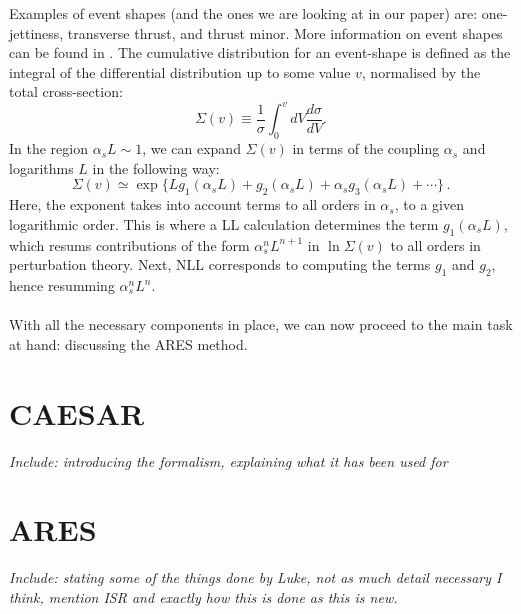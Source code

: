 Examples of event shapes (and the ones we are looking at in our paper) are: one-jettiness, transverse thrust, and thrust minor. More information on event shapes can be found in \cite{Banfi:2016yyq}. 
The cumulative distribution for an event-shape is defined as the integral of the differential distribution up to some value $v$, normalised by the total cross-section:
\begin{equation}
	\Sigma(v)\equiv\frac{1}{\sigma}\int_0^vdV\frac{d\sigma}{dV}.
	\label{eq:total-cummulant}
\end{equation}
In the region $\alpha_sL\sim1$, we can expand $\Sigma(v)$ in terms of the coupling $\alpha_s$ and logarithms $L$ in the following way:
\begin{equation}
	\Sigma(v)\simeq\exp\{Lg_1(\alpha_sL)+g_2(\alpha_sL)+\alpha_sg_3(\alpha_sL)+\cdots\}\,.
	\label{eq:resummed-cummulant}
\end{equation}
Here, the exponent takes into account terms to all orders in $\alpha_s$, to a given logarithmic order. This is where a LL calculation determines the term $g_1(\alpha_sL)$, which resums contributions of the form $\alpha_s^nL^{n+1}$ in $\ln\Sigma(v)$ to all orders in perturbation theory. Next, NLL corresponds to computing the terms $g_1$ and $g_2$, hence resumming $\alpha_s^nL^{n}$. \\\\
With all the necessary components in place, we can now proceed to the main task at hand: discussing the ARES method.




\section{CAESAR}
\emph{Include: introducing the formalism, explaining what it has been used for}

\section{ARES}
\emph{Include: stating some of the things done by Luke, not as much detail necessary I think, mention ISR and exactly how this is done as this is new.}

